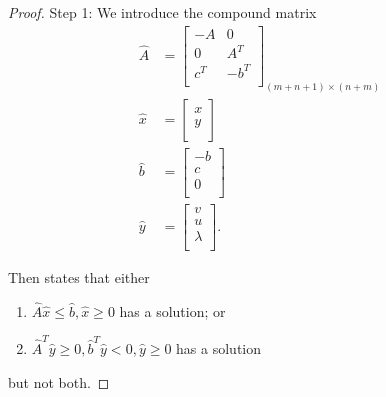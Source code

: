 \begin{proof}
Step 1:
We introduce the compound matrix
\begin{align}
\hat{A} &= \begin{bmatrix}
-A & 0 \\
0  & A^T \\
c^T & -b^T \\
\end{bmatrix}_{(m+n+1) \times (n+m)} \\
\hat{x} &= \begin{bmatrix}
x \\
y \\
\end{bmatrix} \\
\hat{b} &= \begin{bmatrix}
-b \\
c  \\
0 \\
\end{bmatrix} \\
\hat{y} &= \begin{bmatrix}
v \\
u \\
\lambda \\
\end{bmatrix}.
\end{align}

Then  states that either
\begin{enumerate}
    \item $\hat{A} \hat{x} \le \hat{b}, \hat{x} \ge 0$ has a solution; or 
    \item $\hat{A}^T \hat{y} \ge 0, \hat{b}^T \hat{y} < 0, \hat{y} \ge 0$ has a solution
\end{enumerate}
but not both.


\end{proof}
